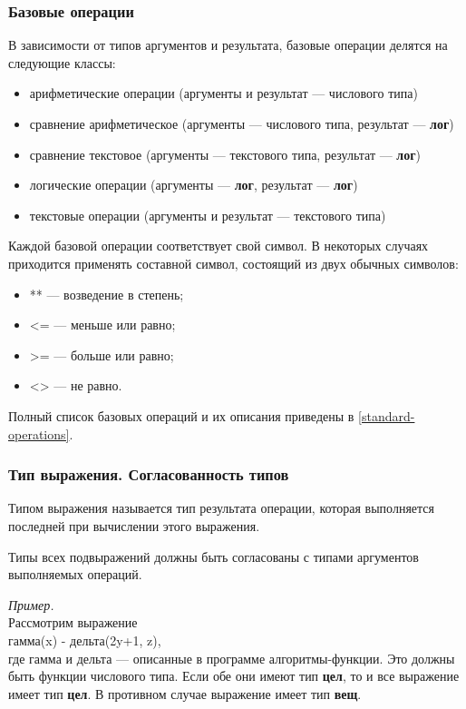\subsubsection{Базовые операции}

	В зависимости от типов аргументов и результата, базовые операции делятся на следующие классы:
\begin{itemize}
\item арифметические операции (аргументы и результат --- числового типа)
\item сравнение арифметическое (аргументы --- числового типа, результат --- \textbf{лог})
\item сравнение текстовое (аргументы --- текстового типа, результат --- \textbf{лог})
\item логические операции (аргументы --- \textbf{лог}, результат --- \textbf{лог})
\item текстовые операции (аргументы и результат --- текстового типа)
\end{itemize}

	Каждой базовой операции соответствует свой символ. В некоторых случаях приходится применять составной символ, состоящий из двух обычных символов:
\begin{itemize}
\item \textsf{**} --- возведение в степень;
\item \textsf{<=} --- меньше или равно;
\item \textsf{>=} --- больше или равно;
\item \textsf{<>} --- не равно.
\end{itemize}

	Полный список базовых операций и их описания приведены в \ref{standard-operations}.
			
\subsubsection{Тип выражения. Согласованность типов}

Типом выражения называется тип результата операции, которая выполняется последней при вычислении этого выражения.

Типы всех подвыражений должны быть согласованы с типами аргументов выполняемых операций.

\emph{Пример.}\\
Рассмотрим выражение\\
\textsf{гамма(x) - дельта(2y+1, z)},\\
где \textsf{гамма} и \textsf{дельта} --- описанные в программе алгоритмы-функции. Это должны быть функции числового типа. Если обе они имеют тип \textbf{цел}, то и все выражение имеет тип \textbf{цел}. В противном случае выражение имеет тип \textbf{вещ}.

